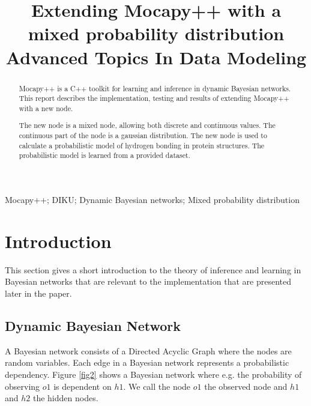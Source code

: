 \documentclass[10pt, journal, compsoc, a4paper]{IEEEtran}
\begin{document}
\title{Extending Mocapy++ with a mixed probability distribution\\Advanced Topics In Data Modeling}

\author{
}

\maketitle

\begin{abstract}
Mocapy++ is a C++ toolkit for learning and inference in dynamic Bayesian networks. This report describes the implementation, testing and results of extending Mocapy++ with a new node. 

The new node is a mixed node, allowing both discrete and continuous values. The continuous part of the node is a gaussian distribution. The new node is used to calculate a probabilistic model of hydrogen bonding in protein structures. The probabilistic model is learned from a provided dataset.
\end{abstract}

\begin{IEEEkeywords}
Mocapy++; DIKU; Dynamic Bayesian networks; Mixed probability distribution
\end{IEEEkeywords}


\section{Introduction} %
\label{sec:introduction}

This section gives a short introduction to the theory of inference and learning in Bayesian networks that are relevant to the implementation that are presented later in the paper.

\subsection{Dynamic Bayesian Network} %
\label{sub:dynamic_bayesian_network}
A Bayesian network consists of a Directed Acyclic Graph where the nodes are random variables. Each edge in a Bayesian network represents a probabilistic dependency. Figure \ref{fig2} shows a Bayesian network where e.g. the probability of observing $o1$ is dependent on $h1$. We call the node $o1$ the observed node and $h1$ and $h2$ the hidden nodes. 
\end{document}

